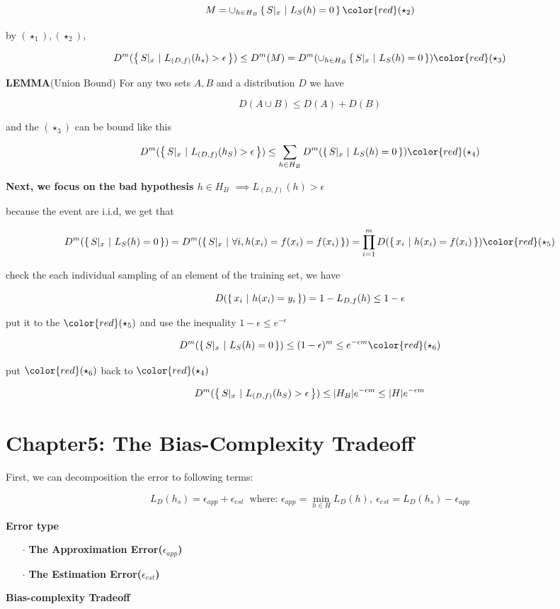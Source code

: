 $$M = \cup_{h \in H_B}\sett{S|_x ~|~ L_S(h) = 0}\color{red}(\star_2)$$

by $(\star_1),(\star_2)$,

$$D^m(\sett{S|_x~|~L_{(D,f)}(h_s)>\epsilon}) \leq D^m(M) = D^m(\cup_{h\in H_B}\sett{S|_x ~|~ L_S(h) = 0})\color{red}(\star_3)$$

\textbf{LEMMA}(Union Bound) For any two sets $A,B$ and a distribution $D$ we have

$$D(A\cup B) \leq D(A) + D(B)$$

and the $(\star_3)$ can be bound like this

$$D^m(\sett{S|_x ~|~ L_{(D,f)}(h_S)>\epsilon}) \leq \sum_{h \in H_B}D^m(\sett{S|_x ~|~ L_S(h) = 0})\color{red}(\star_4)$$

\textbf{Next, we focus on the bad hypothesis $h \in H_B$} $\implies L_{(D,f)}(h) > \epsilon$

because the event are i.i.d, we get that

$$D^m(\sett{S|_x~|~L_S(h)=0}) = D^m(\sett{S|_x ~|~\forall i,h(x_i) = f(x_i) = f(x_i)}) = \prod^m_{i=1}D(\sett{x_i~|~h(x_i) = f(x_i)})\color{red}(\star_5)$$

check the each individual sampling of an element of the training set, we have

$$D(\left\{ \,x_i~|~h(x_i) = y_i \,\right\}) = 1 - L_{D,f}(h) \leq 1 - \epsilon$$

put it to the $\color{red}(\star_5)$ and use the inequality $1 - \epsilon \leq e^{-\epsilon}$

$$D^m(\sett{S|_x~|~ L_S(h) = 0}) \leq (1 -\epsilon)^m \leq e^{-\epsilon m}\color{red}(\star_6)$$

put $\color{red}(\star_6)$ back to $\color{red}(\star_4)$

$$D^m(\left\{ \,S|_x ~|~ L_{(D,f)}(h_S)>\epsilon \,\right\}) \leq |H_B|e^{-\epsilon m} \leq |H|e^{-\epsilon m}$$










\newpage


\section*{Chapter5: The Bias-Complexity Tradeoff}

First, we can decomposition the error to following terms:

$$L_D(h_s) = \epsilon_{app} + \epsilon_{est} ~\text{ where: } \epsilon_{app} = \min_{h \in H}L_D(h),~\epsilon_{est} = L_D(h_s) - \epsilon_{app}$$


\textbf{Error type}
\begin{enumerate}
	\item[$\cdot$] \textbf{The Approximation Error($\epsilon_{app}$)}
	\item[$\cdot$] \textbf{The Estimation Error($\epsilon_{est}$)}
\end{enumerate}

\textbf{Bias-complexity Tradeoff}













